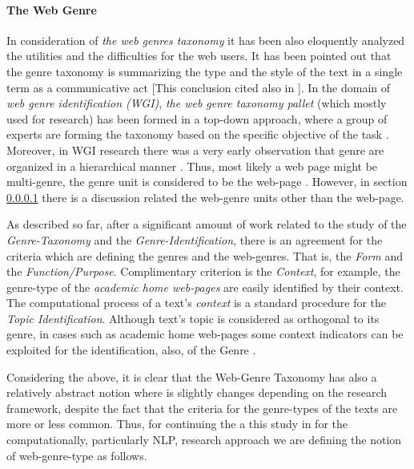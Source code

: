 \paragraph{The Web Genre} In consideration of \textit{the web genres taxonomy} it has been also eloquently analyzed the utilities and the difficulties for the web users. It has been pointed out that the genre taxonomy is summarizing the type and the style of the text in a single term as a communicative act [This conclusion cited also in \parencite{de2009genre}]. In the domain of \textit{web genre identification (WGI)}, \textit{the web genre taxonomy pallet} (which mostly used for research) has been formed in a top-down approach, where a group of experts are forming the taxonomy based on the specific objective of the task \parencite{crowston2011problems}. Moreover, in WGI research there was a very early observation that genre are organized in a hierarchical manner \parencite{wu2010fine}. Thus, most likely a web page might be multi-genre, the genre unit is considered to be the web-page \parencite{madjarov2015web,jebari2015combination}. However, in section \ref{} there is a discussion related the web-genre units other than the web-page.

As described so far, after a significant amount of work related to the study of the \textit{Genre-Taxonomy} and the \textit{Genre-Identification}, there is an agreement for the criteria which are defining the genres and the  web-genres. That is, the \textit{Form} and the \textit{Function/Purpose}. Complimentary criterion is the \textit{Context}, for example, the genre-type of the \textit{academic home web-pages} are easily identified by their context. The computational process of a text's \textit{context} is a standard procedure for the \textit{Topic Identification}. Although text's topic is considered as orthogonal to its genre, in cases such as academic home web-pages some context indicators can be exploited for the identification, also, of the Genre \parencite{coutinho2009describe,crowston2011problems,kanaris2009learning,jebari2015combination,gollapalli2011identifying}. 

Considering the above, it is clear that the Web-Genre Taxonomy has also a relatively abstract notion where is slightly changes depending on the research framework, despite the fact that the criteria for the genre-types of the texts are more or less common. Thus, for continuing the a this study in for the computationally, particularly NLP, research approach we are defining the notion of web-genre-type as follows.   

